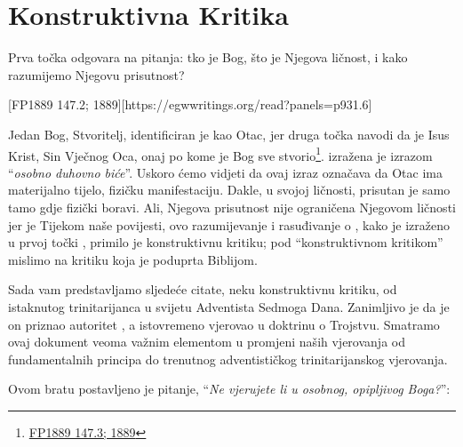 \chapter{Konstruktivna Kritika}

Prva točka  odgovara na pitanja: tko je Bog, što je Njegova ličnost, i kako razumijemo Njegovu prisutnost?

[FP1889 147.2; 1889][https://egwwritings.org/read?panels=p931.6]

Jedan Bog, Stvoritelj, identificiran je kao Otac, jer druga točka  navodi da je Isus Krist, Sin Vječnog Oca, onaj po kome je Bog sve stvorio\footnote{\href{https://egwwritings.org/?ref=en_FP1889.147.3&para=931.7}{FP1889 147.3; 1889}}.  izražena je izrazom “\textit{osobno duhovno biće}”. Uskoro ćemo vidjeti da ovaj izraz označava da Otac ima materijalno tijelo, fizičku manifestaciju. Dakle, u svojoj ličnosti, prisutan je samo tamo gdje fizički boravi. Ali, Njegova prisutnost nije ograničena Njegovom ličnosti jer je  Tijekom naše povijesti, ovo razumijevanje i rasuđivanje o , kako je izraženo u prvoj točki , primilo je konstruktivnu kritiku; pod “konstruktivnom kritikom” mislimo na kritiku koja je poduprta Biblijom.

Sada vam predstavljamo sljedeće citate, neku konstruktivnu kritiku, od istaknutog trinitarijanca u svijetu Adventista Sedmoga Dana. Zanimljivo je da je on priznao autoritet , a istovremeno vjerovao u doktrinu o Trojstvu. Smatramo ovaj dokument veoma važnim elementom u promjeni naših vjerovanja od fundamentalnih principa do trenutnog adventističkog trinitarijanskog vjerovanja.

Ovom bratu postavljeno je pitanje, “\textit{Ne vjerujete li u osobnog, opipljivog Boga?}”:


